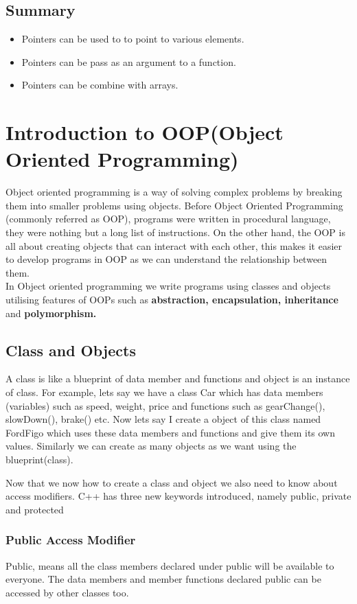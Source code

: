 \documentclass[11pt, a4paper]{article}
\begin{document}
\subsection{Summary}
\begin{itemize}
    \item Pointers can be used to to point to various elements.
    \item Pointers can be pass as an argument to a function.
    \item Pointers can be combine with arrays.
\end{itemize}

\newpage
\section{Introduction to OOP(Object Oriented Programming)}
Object oriented programming is a way of solving complex problems by breaking
them into smaller problems using objects. Before Object Oriented Programming
(commonly referred as OOP), programs were written in procedural language,
they were nothing but a long list of instructions. On the other hand, the OOP
is all about creating objects that can interact with each other, this makes it
easier to develop programs in OOP as we can understand the relationship between them.\\
In Object oriented programming we write programs using classes and objects utilising
features of OOPs such as \textbf{abstraction, encapsulation, inheritance} and
\textbf{polymorphism.}

\subsection{Class and Objects}
A class is like a blueprint of data member and functions and object is an instance
of class. For example, lets say we have a class Car which has data members (variables)
such as speed, weight, price and functions such as gearChange(), slowDown(), brake() etc.
Now lets say I create a object of this class named FordFigo which uses these data members
and functions and give them its own values. Similarly we can create as many objects as we
want using the blueprint(class).

Now that we now how to create a class and object we also need to know about access modifiers.
C++ has three new keywords introduced, namely public, private and protected

\subsubsection{Public Access Modifier}
Public, means all the class members declared under public will be available to everyone.
The data members and member functions declared public can be accessed by other classes too.

\end{document}
